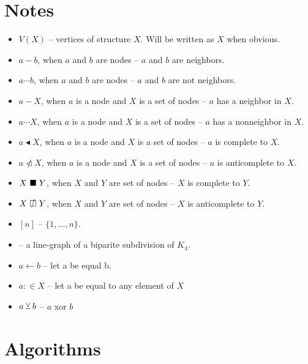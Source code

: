 

\author{Adrian Siwiec}
\date{\today{}}


\section{Notes}
\begin{itemize}
	\item $V(X)$ -- vertices of structure $X$. Will be written as $X$ when obvious.
	\item $a - b$, when $a$ and $b$ are nodes -- $a$ and $b$ are neighbors.
	\item $a \cdots b$, when $a$ and $b$ are nodes -- $a$ and $b$ are not neighbors.
	\item $a - X$, when $a$ is a node and $X$ is a set of nodes -- $a$ has a neighbor in $X$.
	\item $a \cdots X$, when $a$ is a node and $X$ is a set of nodes -- $a$ has a nonneighbor in $X$.
	\item $a \blacktriangleleft  X$, when $a$ is a node and $X$ is a set of nodes -- $a$ is complete to $X$.
	\item $a \ntriangleleft X$, when $a$ is a node and $X$ is a set of nodes -- $a$ is anticomplete to $X$.
	\item $X \ \blacksquare\  Y$, when $X$ and $Y$ are set of nodes -- $X$ is complete to $Y$.
	\item $X \setAntiComplete Y$, when $X$ and $Y$ are set of nodes -- $X$ is anticomplete to $Y$.
	\item $[n]$  -- $\{1, \ldots, n\}$.
	\item \LGBSK -- a line-graph of a biparite subdivision of $K_4$.
	\item $a \gets b$ -- let a be equal b.
	\item $a :\in X$ -- let a be equal to any element of $X$
	\item $a \veebar b$ -- $a$ xor $b$
\end{itemize}
	
\section{Algorithms}
\begin{algorithm}
\end{algorithm}
  



	


	

